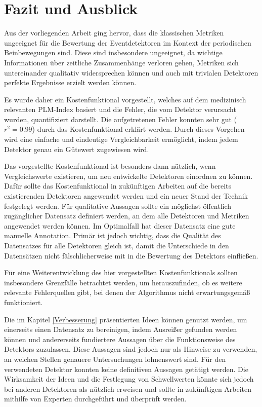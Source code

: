 \chapter{Fazit und Ausblick}\label{chap:Fazit_und_Ausblick}

Aus der vorliegenden Arbeit ging hervor, dass die klassischen Metriken ungeeignet für die Bewertung der Eventdetektoren im Kontext der periodischen Beinbewegungen sind. Diese sind insbesondere ungeeignet, da wichtige Informationen über zeitliche Zusammenhänge verloren gehen, Metriken sich untereinander qualitativ widersprechen können und auch mit trivialen Detektoren perfekte Ergebnisse erzielt werden können.

Es wurde daher ein Kostenfunktional vorgestellt, welches auf dem medizinisch relevanten PLM-Index basiert und die Fehler, die vom Detektor verursacht wurden, quantifiziert darstellt. Die aufgetretenen Fehler konnten sehr gut ($r^{2} = 0.99$) durch das Kostenfunktional erklärt werden. Durch dieses Vorgehen wird eine einfache und eindeutige Vergleichbarkeit ermöglicht, indem jedem Detektor genau ein Gütewert zugewiesen wird. 

Das vorgestellte Kostenfunktional ist besonders dann nützlich, wenn Vergleichswerte existieren, um neu entwickelte Detektoren einordnen zu können. Dafür sollte das Kostenfunktional in zukünftigen Arbeiten auf die bereits existierenden Detektoren angewendet werden und ein neuer Stand der Technik festgelegt werden. Für qualitative Aussagen sollte ein möglichst öffentlich zugänglicher Datensatz definiert werden, an dem alle Detektoren und Metriken angewendet werden können. Im Optimalfall hat dieser Datensatz eine gute manuelle Annotation. Primär ist jedoch wichtig, dass die Qualität des Datensatzes für alle Detektoren gleich ist, damit die Unterschiede in den Datensätzen nicht fälschlicherweise mit in die Bewertung des Detektors einfließen.


Für eine Weiterentwicklung des hier vorgestellten Kostenfunktionals sollten insbesondere Grenzfälle betrachtet werden, um herauszufinden, ob es weitere relevante Fehlerquellen gibt, bei denen der Algorithmus nicht erwartungsgemäß funktioniert. 

Die im Kapitel \ref{Verbesserung} präsentierten Ideen können genutzt werden, um einerseits einen Datensatz zu bereinigen, indem Ausreißer gefunden werden können und andererseits fundiertere Aussagen über die Funktionsweise des Detektors zuzulassen. Diese Aussagen sind jedoch nur als Hinweise zu verwenden, an welchen Stellen genauere Untersuchungen lohnenswert sind. Für den verwendeten Detektor konnten keine definitiven Aussagen getätigt werden.
Die Wirksamkeit der Ideen und die Festlegung von Schwellwerten könnte sich jedoch bei anderen Detektoren als nützlich erweisen und sollte in zukünftigen Arbeiten mithilfe von Experten durchgeführt und überprüft werden.
